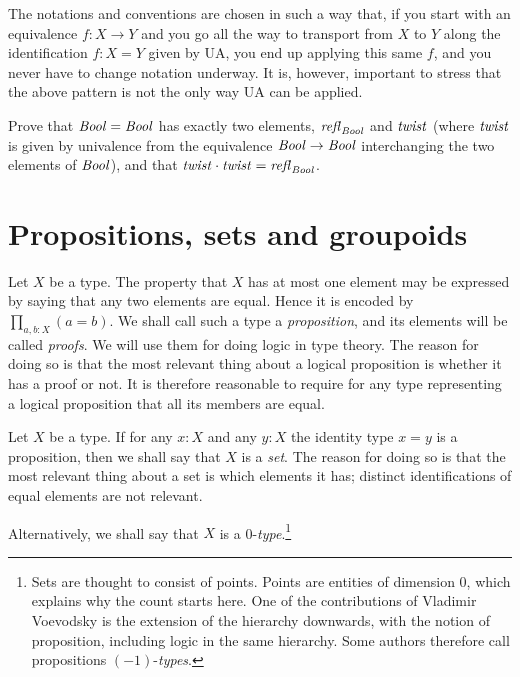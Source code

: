 The notations and conventions are chosen in such a way that,
if you start with an equivalence $f : X\to Y$ and you go all 
the way to transport from $X$ to $Y$ along the identification
$f: X=Y$ given by UA, you end up applying this same $f$, 
and you never have to change notation underway. 
It is, however, important to stress that the above pattern is
not the only way UA can be applied.

\begin{xca}\label{xca:C2}
Prove that $\mathop{\mathit{Bool}}=\mathop{\mathit{Bool}}$ has exactly two elements, 
$\mathop{{\it refl}_{\mathop{\mathit{Bool}}}}$ and $\mathit{twist}$ (where $\mathit{twist}$ is given by 
univalence from the equivalence $\mathop{\mathit{Bool}}\to\mathop{\mathit{Bool}}$ interchanging 
the two elements of $\mathop{\mathit{Bool}}$), and that $\mathit{twist}\cdot\mathit{twist}=\mathop{{\it refl}_{\mathop{\mathit{Bool}}}}$.
\end{xca}


\section{Propositions, sets and groupoids}
\label{sec:props-sets-grpds}

Let $X$ be a type.  The property that $X$ has at most one element may 
be expressed by saying that any two elements are equal. 
Hence it is encoded by $\prod_{a,b:X} (a=b)$.  
We shall call such a type a \emph{proposition}, 
and its elements will be called \emph{proofs}.
We will use them for doing logic in type theory.
The reason for doing so is that the most relevant
thing about a logical proposition is whether it has a proof or not.
It is therefore reasonable to require for any type representing 
a logical proposition that all its members are equal.

Let $X$ be a type.  If for any $x:X$ and any $y:X$ the identity 
type $x=y$ is a proposition, then we shall say that $X$ is a \emph{set}.
The reason for doing so is that the most relevant
thing about a set is which elements it has; distinct identifications
of equal elements are not relevant.

Alternatively, we shall say that $X$ is a 0-\emph{type}.\footnote{%
Sets are thought to consist of points. Points are entities of dimension 0, 
which explains why the count starts here.
One of the contributions of Vladimir Voevodsky is the extension of
the hierarchy downwards, with the notion of proposition,
including logic in the same hierarchy.
Some authors therefore call propositions $(-1)$-\emph{types}.} 

